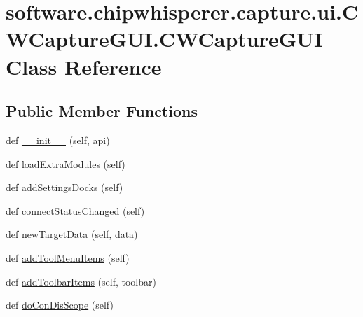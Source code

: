 \hypertarget{classsoftware_1_1chipwhisperer_1_1capture_1_1ui_1_1CWCaptureGUI_1_1CWCaptureGUI}{}\section{software.\+chipwhisperer.\+capture.\+ui.\+C\+W\+Capture\+G\+U\+I.\+C\+W\+Capture\+G\+U\+I Class Reference}
\label{classsoftware_1_1chipwhisperer_1_1capture_1_1ui_1_1CWCaptureGUI_1_1CWCaptureGUI}
\subsection*{Public Member Functions}
\begin{DoxyCompactItemize}
\item 
def \hyperlink{classsoftware_1_1chipwhisperer_1_1capture_1_1ui_1_1CWCaptureGUI_1_1CWCaptureGUI_ab4cad26e08c18db538795b31b669c2a7}{\+\_\+\+\_\+init\+\_\+\+\_\+} (self, api)
\item 
def \hyperlink{classsoftware_1_1chipwhisperer_1_1capture_1_1ui_1_1CWCaptureGUI_1_1CWCaptureGUI_a656e60d656da55d4adb5be209088dc0b}{load\+Extra\+Modules} (self)
\item 
def \hyperlink{classsoftware_1_1chipwhisperer_1_1capture_1_1ui_1_1CWCaptureGUI_1_1CWCaptureGUI_ac1234cf4185510a43eb37f20258e6b16}{add\+Settings\+Docks} (self)
\item 
def \hyperlink{classsoftware_1_1chipwhisperer_1_1capture_1_1ui_1_1CWCaptureGUI_1_1CWCaptureGUI_ab1c3c6f7be245c9e247d79f0a9dee5af}{connect\+Status\+Changed} (self)
\item 
def \hyperlink{classsoftware_1_1chipwhisperer_1_1capture_1_1ui_1_1CWCaptureGUI_1_1CWCaptureGUI_a5cf0065564031688b9f10b7200d9fc21}{new\+Target\+Data} (self, data)
\item 
def \hyperlink{classsoftware_1_1chipwhisperer_1_1capture_1_1ui_1_1CWCaptureGUI_1_1CWCaptureGUI_a8171812fe991d76c9bb9c25b3367f3a1}{add\+Tool\+Menu\+Items} (self)
\item 
def \hyperlink{classsoftware_1_1chipwhisperer_1_1capture_1_1ui_1_1CWCaptureGUI_1_1CWCaptureGUI_a2b5e51f14514b244ca2eef9000651063}{add\+Toolbar\+Items} (self, toolbar)
\item 
def \hyperlink{classsoftware_1_1chipwhisperer_1_1capture_1_1ui_1_1CWCaptureGUI_1_1CWCaptureGUI_afaccb512c11c263490fadf1f0255ddaf}{do\+Con\+Dis\+Scope} (self)
\item 

\end{DoxyCompactItemize}
